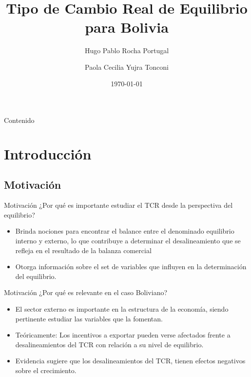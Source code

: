 \documentclass{beamer}
\title{Tipo de Cambio Real de Equilibrio para Bolivia}
\author{Hugo Pablo Rocha Portugal \and Paola Cecilia Yujra Tonconi}
\date{\today}
\begin{document}
\begin{frame}
\titlepage
\end{frame}

\begin{frame}{Contenido}
\begin{multicols}{2}
\tableofcontents
\end{multicols}
\end{frame}

\section[Introducción]{Introducción}
\subsection[Motivación]{Motivación}
\begin{frame}{Motivación}
¿Por qué es importante estudiar el TCR desde la perspectiva del equilibrio?
\begin{itemize}
\item Brinda nociones para encontrar el balance entre el denominado equilibrio interno y externo, lo que contribuye a determinar el desalineamiento que se refleja en el resultado de la balanza comercial   
\item Otorga información sobre el set de variables que influyen en la determinación del equilibrio.
\end{itemize}
\end{frame}

\begin{frame}{Motivación}
¿Por qué es relevante en el caso Boliviano?
\begin{itemize}
\item El sector externo es importante en la estructura de la economía, siendo pertinente estudiar las variables que la fomentan.
\item Teóricamente: Los incentivos a exportar pueden verse afectados frente a desalineamientos del TCR con relación a su nivel de equilibrio. 
\item Evidencia sugiere que los desalineamientos del TCR, tienen efectos negativos sobre el crecimiento.   
\end{itemize}
\end{frame}
\end{document}
